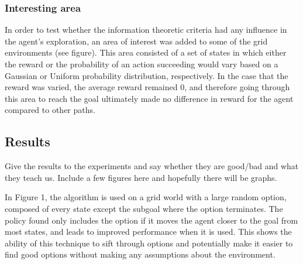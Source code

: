 \documentclass{acm_proc_article-sp}
\begin{document}

\subsubsection{Interesting area}

In order to test whether the information theoretic criteria had any influence in the agent's exploration, an area of interest was added to some of the grid environments (see figure). This area consisted of a set of states in which either the reward or the probability of an action succeeding would vary based on a Gaussian or Uniform probability distribution, respectively. In the case that the reward was varied, the average reward remained 0, and therefore going through this area to reach the goal ultimately made no difference in reward for the agent compared to other paths.


\subsection{Results}

Give the results to the experiments and say whether they are good/bad and what they teach us. Include a few figures here and hopefully there will be graphs.

In Figure 1, the algorithm is used on a grid world with a large random option, composed of every state except the subgoal where the option terminates. The policy found only includes the option if it moves the agent closer to the goal from most states, and leads to improved performance when it is used. This shows the ability of this technique to sift through options and potentially make it easier to find good options without making any assumptions about the environment.
\end{document}
